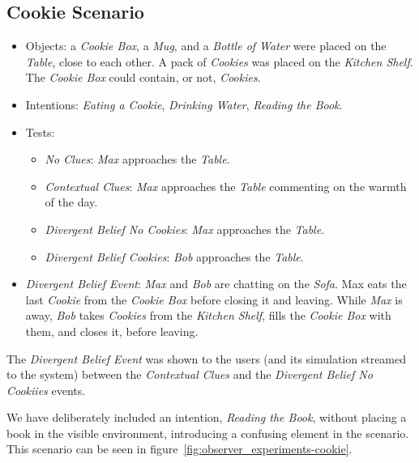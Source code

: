 \subsection{Cookie Scenario}
\begin{itemize}
\item Objects: a \textit{Cookie Box}, a \textit{Mug}, and a \textit{Bottle of Water} were placed on the \textit{Table}, close to each other. A pack of \textit{Cookies} was placed on the \textit{Kitchen Shelf}. The \textit{Cookie Box} could contain, or not, \textit{Cookies}.
\item Intentions: \textit{Eating a Cookie}, \textit{Drinking Water}, \textit{Reading the Book}.
\item Tests:
\begin{itemize}
	\item \textit{No Clues}: \textit{Max} approaches the \textit{Table}.
    \item \textit{Contextual Clues}: \textit{Max} approaches the \textit{Table} commenting on the warmth of the day.
	\item \textit{Divergent Belief No Cookies}: \textit{Max} approaches the \textit{Table}.
	\item \textit{Divergent Belief Cookies}: \textit{Bob} approaches the \textit{Table}.
\end{itemize}
\item  \textit{Divergent Belief Event}:  \textit{Max} and \textit{Bob} are chatting on the \textit{Sofa}. Max eats the last \textit{Cookie} from the \textit{Cookie Box} before closing it and leaving. While \textit{Max} is away, \textit{Bob} takes \textit{Cookies} from the \textit{Kitchen Shelf}, fills the \textit{Cookie Box} with them, and closes it, before leaving.
\end{itemize}

The \textit{Divergent Belief Event} was shown to the users (and its simulation streamed to the system) between the \textit{Contextual Clues} and the \textit{Divergent Belief No Cookiies} events. 


We have deliberately included an intention, \textit{Reading the Book}, without placing a book in the visible environment, introducing a confusing element in the scenario. This scenario can be seen in figure~\ref{fig:observer_experiments-cookie}.


